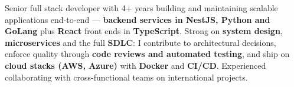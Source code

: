 
\begin{cvparagraph}
Senior full stack developer with 4+ years building and maintaining scalable applications end-to-end --- \textbf{backend services in NestJS, Python and GoLang} plus \textbf{React} front ends in \textbf{TypeScript}. Strong on \textbf{system design}, \textbf{microservices} and the full \textbf{SDLC}: I contribute to architectural decisions, enforce quality through \textbf{code reviews and automated testing}, and ship on \textbf{cloud stacks (AWS, Azure)} with \textbf{Docker} and \textbf{CI/CD}. Experienced collaborating with cross-functional teams on international projects.
\end{cvparagraph}
